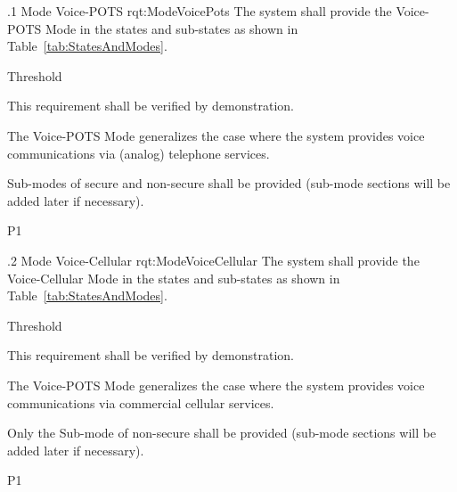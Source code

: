 \ONERQMTVKSA
{\RqtNumberBase.1}
{Mode Voice-POTS}
{rqt:ModeVoicePots}
{The system shall provide the Voice-POTS Mode in the states and sub-states as shown in Table~\ref{tab:StatesAndModes}.}
{
	\item [Phase 1] Threshold
}
{This requirement shall be verified by demonstration.}

{
	\item The Voice-POTS Mode generalizes the case where the system provides voice communications via \POTS (analog) telephone services.
	\item Sub-modes of secure and non-secure shall be provided (sub-mode sections will be added later if necessary).
}
{P1}


\ONERQMTVKSA
{\RqtNumberBase.2}
{Mode Voice-Cellular}
{rqt:ModeVoiceCellular}
{The system shall provide the Voice-Cellular Mode in the states and sub-states as shown in Table~\ref{tab:StatesAndModes}.}
{
	\item [Phase 1] Threshold
}
{This requirement shall be verified by demonstration.}

{
	\item The Voice-POTS Mode generalizes the case where the system provides voice communications via commercial cellular services.
	\item Only the Sub-mode of non-secure shall be provided (sub-mode sections will be added later if necessary). 
}
{P1}


